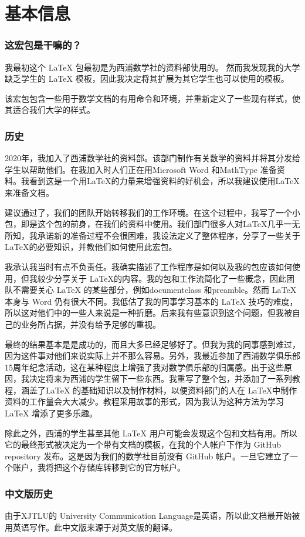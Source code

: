 \part{基本信息}
\pagestyle{headings}
\section{这宏包是干嘛的？}
我最初这个 \LaTeX{} 包最初是为西浦数学社的资料部使用的。 然而我发现我的大学缺乏学生的 \LaTeX{} 模板，因此我决定将其扩展为其它学生也可以使用的模板。

该宏包包含一些用于数学文档的有用命令和环境，并重新定义了一些现有样式，使其适合我们大学的样式。 

\section{历史}
2020年，我加入了西浦数学社的资料部。该部门制作有关数学的资料并将其分发给学生以帮助他们。在我加入时人们正在用Microsoft Word 和MathType 准备资料。我看到这是一个用\LaTeX 的力量来增强资料的好机会，所以我建议使用\LaTeX 来准备文档。

建议通过了，我们的团队开始转移我们的工作环境。在这个过程中，我写了一个小包，即是这个包的前身，在我们的资料中使用。我们部门很多人对\LaTeX{}几乎一无所知，我承诺新的准备过程不会很困难，我设法定义了整体程序，分享了一些关于\LaTeX 的必要知识，并教他们如何使用此宏包。

我承认我当时有点不负责任。我确实描述了工作程序是如何以及我的包应该如何使用，但我较少分享关于 \LaTeX 的内容。我的包和工作流简化了一些概念，因此团队不需要关心 \LaTeX{} 的某些部分，例如documentclass 和preamble。然而 \LaTeX{} 本身与 Word 仍有很大不同。我低估了我的同事学习基本的 \LaTeX{} 技巧的难度，所以这对他们中的一些人来说是一种折磨。后来我有些意识到这个问题，但我被自己的业务所占据，并没有给予足够的重视。

最终的结果基本是是成功的，而且大多已经足够好了。但我为我的同事感到难过，因为这件事对他们来说实际上并不那么容易。另外，我最近参加了西浦数学俱乐部15周年纪念活动，这在某种程度上增强了我对数学俱乐部的归属感。出于这些原因，我决定将来为西浦的学生留下一些东西。我重写了整个包，并添加了一系列教程，涵盖了\LaTeX{} 的基础知识以及制作材料，以便资料部门的人在 \LaTeX 中制作资料的工作量会大大减少。教程采用故事的形式，因为我认为这种方法为学习\LaTeX{} 增添了更多乐趣。

除此之外，西浦的学生甚至其他 \LaTeX{} 用户可能会发现这个包和文档有用。所以它的最终形式被决定为一个带有文档的模板，在我的个人帐户下作为 GitHub repository 发布。这是因为我们的数学社目前没有 GitHub 帐户。一旦它建立了一个账户，我将把这个存储库转移到它的官方帐户。

\section{中文版历史}
由于XJTLU的 University Communication Language是英语，所以此文档最开始被用英语写作。此中文版来源于对英文版的翻译。